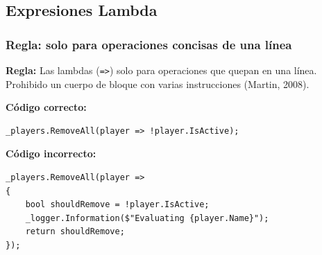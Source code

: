 \subsection{Expresiones Lambda}

\subsubsection{Regla: solo para operaciones concisas de una línea}

\textbf{Regla:} Las lambdas (\texttt{=>}) solo para operaciones que quepan en una línea. Prohibido un cuerpo de bloque con varias instrucciones (Martin, 2008).

\textbf{Código correcto:}
\begin{lstlisting}[style=csharpstyle]
_players.RemoveAll(player => !player.IsActive);
\end{lstlisting}

\textbf{Código incorrecto:}
\begin{lstlisting}[style=csharpstyle]
_players.RemoveAll(player =>
{
    bool shouldRemove = !player.IsActive;
    _logger.Information($"Evaluating {player.Name}");
    return shouldRemove;
});
\end{lstlisting}
